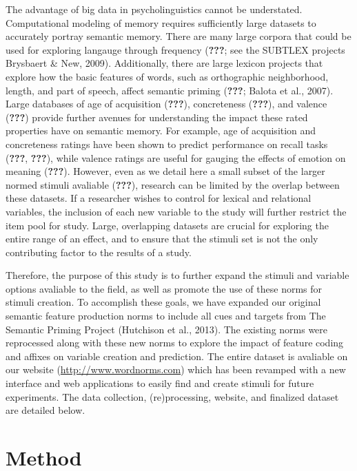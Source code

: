 \documentclass[english,man]{apa6}
\theoremstyle{definition}
\theoremstyle{definition}
\theoremstyle{definition}
\theoremstyle{remark}
\begin{document}
The advantage of big data in psycholinguistics cannot be understated.
Computational modeling of memory requires sufficiently large datasets to
accurately portray semantic memory. There are many large corpora that
could be used for exploring langauge through frequency ({\textbf{???}};
see the SUBTLEX projects Brysbaert \& New, 2009). Additionally, there
are large lexicon projects that explore how the basic features of words,
such as orthographic neighborhood, length, and part of speech, affect
semantic priming ({\textbf{???}}; Balota et al., 2007). Large databases
of age of acquisition ({\textbf{???}}), concreteness ({\textbf{???}}),
and valence ({\textbf{???}}) provide further avenues for understanding
the impact these rated properties have on semantic memory. For example,
age of acquisition and concreteness ratings have been shown to predict
performance on recall tasks ({\textbf{???}}, {\textbf{???}}), while
valence ratings are useful for gauging the effects of emotion on meaning
({\textbf{???}}). However, even as we detail here a small subset of the
larger normed stimuli avaliable ({\textbf{???}}), research can be
limited by the overlap between these datasets. If a researcher wishes to
control for lexical and relational variables, the inclusion of each new
variable to the study will further restrict the item pool for study.
Large, overlapping datasets are crucial for exploring the entire range
of an effect, and to ensure that the stimuli set is not the only
contributing factor to the results of a study.

Therefore, the purpose of this study is to further expand the stimuli
and variable options avaliable to the field, as well as promote the use
of these norms for stimuli creation. To accomplish these goals, we have
expanded our original semantic feature production norms to include all
cues and targets from The Semantic Priming Project (Hutchison et al.,
2013). The existing norms were reprocessed along with these new norms to
explore the impact of feature coding and affixes on variable creation
and prediction. The entire dataset is avaliable on our website
(\url{http://www.wordnorms.com}) which has been revamped with a new
interface and web applications to easily find and create stimuli for
future experiments. The data collection, (re)processing, website, and
finalized dataset are detailed below.

\section{Method}\label{method}
\end{document}
